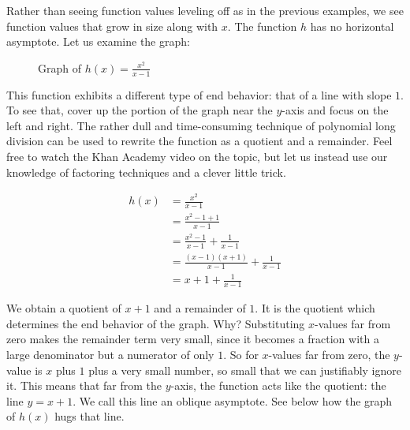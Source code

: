 Rather than seeing function values leveling off as in the previous examples, we see function values that grow in size along with \( x \). The function \( h \) has no horizontal asymptote. Let us examine the graph:

\begin{figure}[htbp]
  \centering
  \caption{Graph of \( h(x) = \frac{x^2}{x - 1} \)}
\end{figure}

This function exhibits a different type of end behavior: that of a line with slope \( 1 \). To see that, cover up the portion of the graph near the \( y \)-axis and focus on the left and right. The rather dull and time-consuming technique of polynomial long division can be used to rewrite the function as a quotient and a remainder. Feel free to watch the Khan Academy video on the topic, but let us instead use our knowledge of factoring techniques and a clever little trick.

\begin{equation} \label{eq1}
\begin{split}
h(x) & = \frac{x^2}{x - 1} \\
& = \frac{x^2 - 1 + 1}{x - 1} \\ 
& = \frac{x^2 - 1}{x - 1} + \frac{1}{x - 1} \\
& = \frac{(x - 1)(x + 1)}{x - 1} + \frac{1}{x - 1} \\
& = x + 1 + \frac{1}{x - 1}
\end{split}
\end{equation}

We obtain a quotient of \( x + 1 \) and a remainder of \( 1 \). It is the quotient which determines the end behavior of the graph. Why? Substituting \( x \)-values far from zero makes the remainder term very small, since it becomes a fraction with a large denominator but a numerator of only \( 1 \). So for \( x \)-values far from zero, the \( y \)-value is \( x \) plus \( 1 \) plus a very small number, so small that we can justifiably ignore it. This means that far from the \( y \)-axis, the function acts like the quotient: the line \( y = x + 1 \). We call this line an oblique asymptote. See below how the graph of \( h(x) \) hugs that line.

